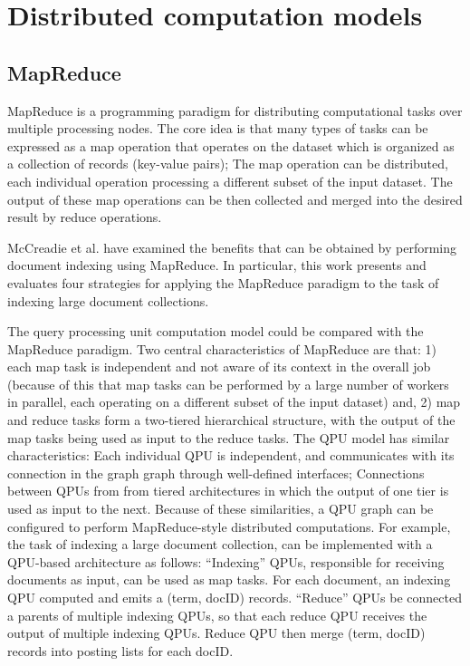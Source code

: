 \section{Distributed computation models}
\label{sec:dataflowmapreduce}

\subsection{MapReduce}

MapReduce \cite{dean:mapreduce} is a programming paradigm for distributing computational tasks over multiple processing nodes.
The core idea is that many types of tasks can be expressed as a map operation that operates on the dataset which is organized
as a collection of records (key-value pairs);
The map operation can be distributed, each individual operation processing a different subset of the input dataset.
The output of these map operations can be then collected and merged into the desired result by reduce operations.

McCreadie et al. \cite{mccreadie:mapreduceindexing} have examined the benefits that can be obtained by performing document
indexing using MapReduce.
In particular, this work presents and evaluates four strategies for applying the MapReduce paradigm
to the task of indexing large document collections.

The query processing unit computation model could be compared with the MapReduce paradigm.
Two central characteristics of MapReduce are that:
1) each map task is independent and not aware of its context in the overall job
(because of this that map tasks can be performed by a large number of workers in parallel, each operating on a different
subset of the input dataset)
and, 2) map and reduce tasks form a two-tiered hierarchical structure,
with the output of the map tasks being used as input to the reduce tasks.
The QPU model has similar characteristics:
Each individual QPU is independent, and communicates with its connection in the graph graph through well-defined interfaces;
Connections between QPUs from from tiered architectures in which the output of one tier is used as input to the next.
Because of these similarities, a QPU graph can be configured to perform MapReduce-style distributed computations.
For example, the task of indexing a large document collection, can be implemented with a QPU-based architecture
as follows:
``Indexing'' QPUs, responsible for receiving documents as input, can be used as map tasks.
For each document, an indexing QPU computed and emits a (term, docID) records.
``Reduce'' QPUs be connected a parents of multiple indexing QPUs,
so that each reduce QPU receives the output of multiple indexing QPUs.
Reduce QPU then merge (term, docID) records into posting lists for each docID.

